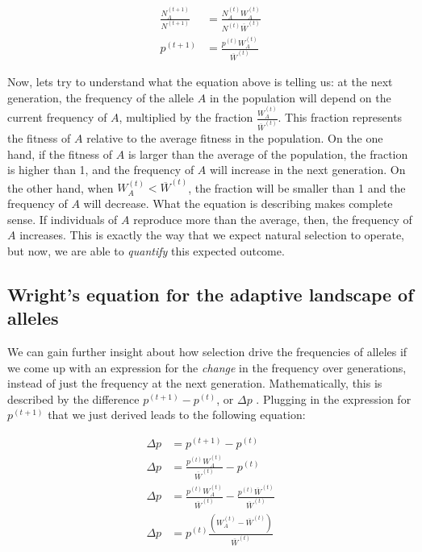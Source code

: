 \documentclass[
]{book}
\begin{document}
\[\begin{aligned}
\frac{N_{A}^{(t+1)}}{N^{(t+1)}}&=\frac{N_{A}^{(t)}W_{A}^{(t)}}{N^{(t)}\overline{W}^{(t)}} \\
p^{(t+1)}&=\frac{p^{(t)}W_{A}^{(t)}}{\overline{W}^{(t)}}
\end{aligned}\]

Now, lets try to understand what the equation above is telling us: at the next generation, the frequency of the allele \(A\) in the population will depend on the current frequency of \(A\), multiplied by the fraction \(\frac{W_{A}^{(t)}}{\overline{W}^{(t)}}\). This fraction represents the fitness of \(A\) relative to the average fitness in the population. On the one hand, if the fitness of \(A\) is larger than the average of the population, the fraction is higher than 1, and the frequency of \(A\) will increase in the next generation. On the other hand, when \(W_{A}^{(t)} < \overline{W}^{(t)}\), the fraction will be smaller than 1 and the frequency of \(A\) will decrease. What the equation is describing makes complete sense. If individuals of \(A\) reproduce more than the average, then, the frequency of \(A\) increases. This is exactly the way that we expect natural selection to operate, but now, we are able to \emph{quantify} this expected outcome.

\hypertarget{wrights-equation-for-the-adaptive-landscape-of-alleles}{%
\subsection{Wright's equation for the adaptive landscape of alleles}\label{wrights-equation-for-the-adaptive-landscape-of-alleles}}

We can gain further insight about how selection drive the frequencies of alleles if we come up with an expression for the \emph{change} in the frequency over generations, instead of just the frequency at the next generation. Mathematically, this is described by the difference \(p^{(t+1)} - p^{(t)}\), or \(\Delta p\) . Plugging in the expression for \(p^{(t+1)}\) that we just derived leads to the following equation:

\[\begin{aligned}
\Delta p&=p^{(t+1)} - p^{(t)} \\
\Delta p&=\frac{p^{(t)}W_{A}^{(t)}}{\overline{W}^{(t)}} - p^{(t)} \\
\Delta p&=\frac{p^{(t)}W_{A}^{(t)}}{\overline{W}^{(t)}} - \frac{p^{(t)}\overline{W}^{(t)}}{\overline{W}^{(t)}} \\
\Delta p&=p^{(t)}\frac{\left(W_{A}^{(t)}-\overline{W}^{(t)}\right)}{\overline{W}^{(t)}}
\end{aligned}\]
\end{document}
